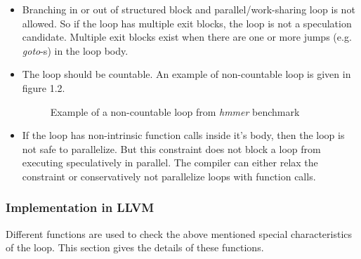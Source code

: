 \documentclass[10pt]{report}          %
\begin{document}
\begin{itemize}

\item Branching in or out of structured block and  parallel/work-sharing loop is not allowed. So if the loop has multiple exit blocks, the loop is not a speculation candidate.  Multiple exit blocks exist when there are one or more jumps (e.g. \textit{goto}-s) in the loop body.

\item The loop should be countable.  An example of non-countable loop is given in figure 1.2. 

\begin{figure}[h]
\label{fig:non_countable}
\begin{center}
\renewcommand{\figure}{Fig.}
\caption{ Example of a non-countable loop from \textit{hmmer} benchmark}
\end{center}
\end{figure}

\item If the loop has non-intrinsic function calls inside it's body, then the loop is not safe to parallelize.  But this constraint does not block a loop from executing speculatively in parallel.  The compiler can either relax the constraint or conservatively not parallelize loops with function calls.

\end{itemize}

\subsubsection{Implementation in LLVM}
\label{LLVMImplementation}
Different functions are used to check the above mentioned special characteristics of the loop.  This section gives the details of these functions.
\end{document}
